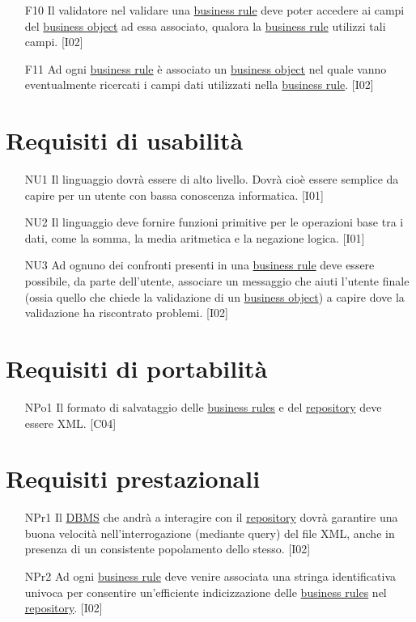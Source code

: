 \begin{itemize}
{\textit{Nota: La rimozione di questo requisito modificher\`a sostanzialmente il carico di lavoro, in particolare la fase di inserimento risulter\`a meno laboriosa permettendoci di concentrarci maggiormente sul soddisfacimento degli altri requisiti.}
}
\item[F10]{Il validatore nel validare una \underline{business rule} deve poter accedere ai campi del \underline{business object} ad essa associato, qualora la \underline{business rule} utilizzi tali campi. [I02]}
\item[F11]{Ad ogni \underline{business rule} \`e associato un \underline{business object} nel quale vanno eventualmente ricercati i campi dati utilizzati nella \underline{business rule}. [I02]}
\end{itemize}

\section{Requisiti di usabilit\`a}
\begin{itemize}
\item[NU1]{Il linguaggio dovr\`a essere di alto livello. Dovr\`a cio\`e essere semplice da capire per un utente con bassa conoscenza informatica. [I01]}
\item[NU2]{Il linguaggio deve fornire funzioni primitive per le operazioni base tra i dati, come la somma, la media aritmetica e la negazione logica. [I01]}
\item[NU3]{Ad ognuno dei confronti presenti in una \underline{business rule} deve essere possibile, da parte dell'utente, associare un messaggio che aiuti l'utente finale (ossia quello che chiede la validazione di un \underline{business object}) a capire dove la validazione ha riscontrato problemi. [I02]}
\end{itemize}

\section{Requisiti di portabilit\`a}
\begin{itemize}
\item[NPo1]{Il formato di salvataggio delle \underline{business rules} e del \underline{repository} deve essere XML. [C04]}
\end{itemize}
\section{Requisiti prestazionali}
\begin{itemize}
 \item[NPr1]{Il \underline{DBMS} che andr\`a a interagire con il \underline{repository} dovr\`a garantire una buona velocit\`a nell'interrogazione (mediante query) del file XML, anche in presenza di un consistente popolamento dello stesso. [I02]}
\item[NPr2]{Ad ogni \underline{business rule} deve venire associata una stringa identificativa univoca per consentire un'efficiente indicizzazione delle \underline{business rules} nel \underline{repository}. [I02]}
\end{itemize}


